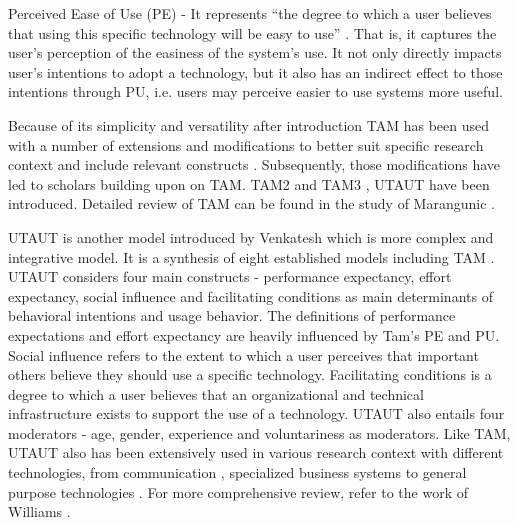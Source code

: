 \documentclass[a4paper,12pt]{article}
\newcommand{\citeyearonly}[1]{\citeyearpar{#1}}
\begin{document}
Perceived Ease of Use (PE) - It represents ``the degree to which a user believes that using this specific technology will be easy to use'' \citep{davis1985technology}. That is, it captures the user's perception of the easiness of the system's use. It not only directly impacts user's intentions to adopt a technology, but it also has an indirect effect to those intentions through PU, i.e. users may perceive easier to use systems more useful.  

Because of its simplicity and versatility after introduction TAM has been used with a number of extensions and modifications to better suit specific research context and include relevant constructs \citep{featherman2003predictingextension, amoako2004extension, burton2006mediationextension}. Subsequently, those modifications have led to scholars building upon on TAM. TAM2 \citep{venkateshDeterminantsPerceivedEase2000} and TAM3 \citep{venkateshTechnologyAcceptanceModel2008}, UTAUT \citep{venkatesh2003utaut} have been introduced. Detailed review of TAM can be found in the study of Marangunic \citeyearonly{marangunic2015technology}.

UTAUT is another model introduced by Venkatesh which is more complex and integrative model. It is a synthesis of eight established models including TAM \citep{venkatesh2003utaut}. UTAUT considers four main constructs - performance expectancy, effort expectancy, social influence and facilitating conditions as main determinants of behavioral intentions and usage behavior. The definitions of performance expectations and effort expectancy are heavily influenced by Tam's PE and PU. Social influence refers to the extent to which a user perceives that important others believe they should use a specific technology. Facilitating conditions is a degree to which a user believes that an organizational and technical infrastructure exists to support the use of a technology. UTAUT also entails four moderators - age, gender, experience and voluntariness as moderators. Like TAM, UTAUT also has been extensively used in various research context with different technologies, from communication \citep{wu2007empirical}, specialized business systems \citep{kijsanayotin2009factors} to general purpose technologies \citep{abu2010internet}. For more comprehensive review, refer to the work of Williams \citeyearonly{williams2015unified}. 
\end{document}
